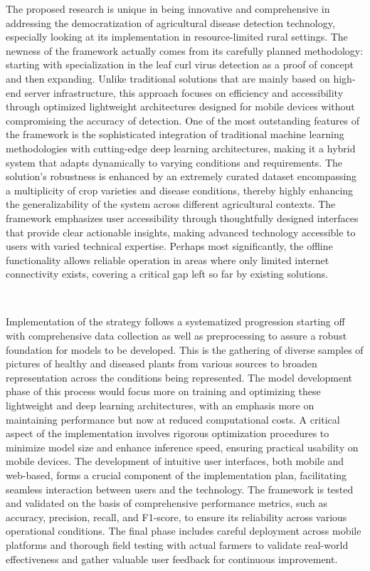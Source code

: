 The proposed research is unique in being innovative and comprehensive in addressing the democratization of agricultural disease detection technology, especially looking at its implementation in resource-limited rural settings. The newness of the framework actually comes from its carefully planned methodology: starting with specialization in the leaf curl virus detection as a proof of concept and then expanding. Unlike traditional solutions that are mainly based on high-end server infrastructure, this approach focuses on efficiency and accessibility through optimized lightweight architectures designed for mobile devices without compromising the accuracy of detection. One of the most outstanding features of the framework is the sophisticated integration of traditional machine learning methodologies with cutting-edge deep learning architectures, making it a hybrid system that adapts dynamically to varying conditions and requirements. The solution's robustness is enhanced by an extremely curated dataset encompassing a multiplicity of crop varieties and disease conditions, thereby highly enhancing the generalizability of the system across different agricultural contexts. The framework emphasizes user accessibility through thoughtfully designed interfaces that provide clear actionable insights, making advanced technology accessible to users with varied technical expertise. Perhaps most significantly, the offline functionality allows reliable operation in areas where only limited internet connectivity exists, covering a critical gap left so far by existing solutions.

\

Implementation of the strategy follows a systematized progression starting off with comprehensive data collection as well as preprocessing to assure a robust foundation for models to be developed. This is the gathering of diverse samples of pictures of healthy and diseased plants from various sources to broaden representation across the conditions being represented. The model development phase of this process would focus more on training and optimizing these lightweight and deep learning architectures, with an emphasis more on maintaining performance but now at reduced computational costs. A critical aspect of the implementation involves rigorous optimization procedures to minimize model size and enhance inference speed, ensuring practical usability on mobile devices. The development of intuitive user interfaces, both mobile and web-based, forms a crucial component of the implementation plan, facilitating seamless interaction between users and the technology. The framework is tested and validated on the basis of comprehensive performance metrics, such as accuracy, precision, recall, and F1-score, to ensure its reliability across various operational conditions. The final phase includes careful deployment across mobile platforms and thorough field testing with actual farmers to validate real-world effectiveness and gather valuable user feedback for continuous improvement.

